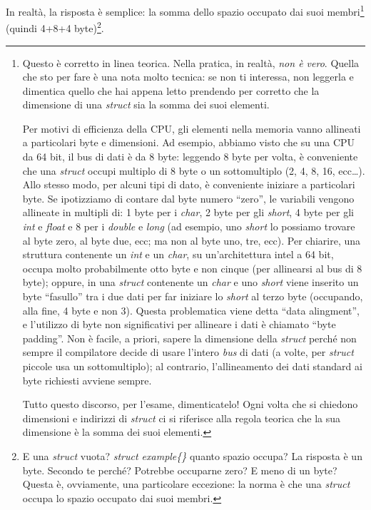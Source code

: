 In realtà, la risposta è semplice: la somma dello spazio occupato dai suoi membri\footnote{Questo è corretto in linea teorica. Nella pratica, in realtà, \emph{non è vero}. Quella che sto per fare è una nota molto tecnica: se non ti interessa, non leggerla e dimentica quello che hai appena letto prendendo per corretto che la dimensione di una \emph{struct} sia la somma dei suoi elementi.

Per motivi di efficienza della CPU, gli elementi nella memoria vanno allineati a particolari byte e dimensioni. Ad esempio, abbiamo visto che su una CPU da 64 bit, il bus di dati è da 8 byte: leggendo 8 byte per volta, è conveniente che una \emph{struct} occupi multiplo di 8 byte o un sottomultiplo (2, 4, 8, 16, ecc\ldots). Allo stesso modo, per alcuni tipi di dato, è conveniente iniziare a particolari byte. Se ipotizziamo di contare dal byte numero ``zero'', le variabili vengono allineate in multipli di: 1 byte per i \emph{char}, 2 byte per gli \emph{short}, 4 byte per gli \emph{int} e \emph{float} e 8 per i \emph{double} e \emph{long} (ad esempio, uno \emph{short} lo possiamo trovare al byte zero, al byte due, ecc; ma non al byte uno, tre, ecc). Per chiarire, una struttura contenente un \emph{int} e un \emph{char}, su un'architettura intel a 64 bit, occupa molto probabilmente otto byte e non cinque (per allinearsi al bus di 8 byte); oppure, in una \emph{struct} contenente un \emph{char} e uno \emph{short} viene inserito un byte ``fasullo'' tra i due dati per far iniziare lo \emph{short} al terzo byte (occupando, alla fine, 4 byte e non 3). Questa problematica viene detta ``data alingment'', e l'utilizzo di byte non significativi per allineare i dati è chiamato ``byte padding''. Non è facile, a priori, sapere la dimensione della \emph{struct} perché non sempre il compilatore decide di usare l'intero \emph{bus} di dati (a volte, per \emph{struct} piccole usa un sottomultiplo); al contrario, l'allineamento dei dati standard ai byte richiesti avviene sempre.

Tutto questo discorso, per l'esame, dimenticatelo! Ogni volta che si chiedono dimensioni e indirizzi di \emph{struct} ci si riferisce alla regola teorica che la sua dimensione è la somma dei suoi elementi.  } (quindi 4+8+4 byte)\footnote{E una \emph{struct} vuota? \emph{struct example\{\}} quanto spazio occupa? La risposta è un byte. Secondo te perché? Potrebbe occuparne zero? E meno di un byte? Questa è, ovviamente, una particolare eccezione: la norma è che una \emph{struct} occupa lo spazio occupato dai suoi membri.}.  \\

